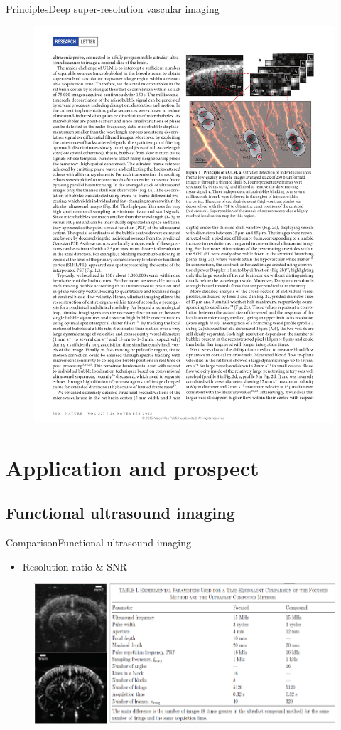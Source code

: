 \documentclass{beamer}
\begin{document}
\begin{frame}{Principles}{Deep super-resolution vascular imaging}
\begin{figure}
	\centering
	\includegraphics[width=0.75\linewidth]{fastimage}
	\label{fig:fastimage}
\end{figure}
\end{frame}




\section{Application and prospect}
\subsection{Functional ultrasound imaging}
\begin{frame}{Comparison}{Functional ultrasound imaging}
  \begin{itemize}
  \item {
    Resolution ratio \& SNR
}
  \end{itemize}
\begin{figure}
	\centering
	\includegraphics[width=1.05\linewidth]{im4}
\end{figure}

\end{frame}
\end{document}
